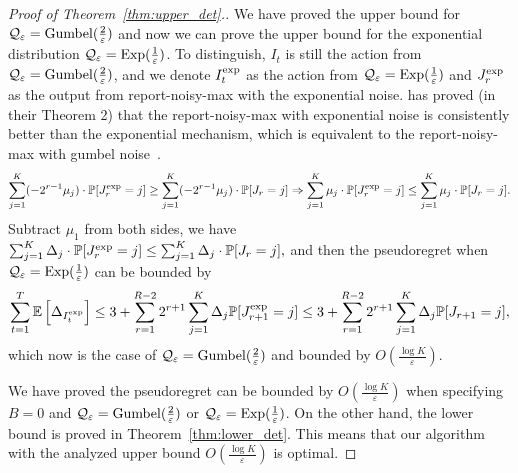 \begin{proof}[Proof of Theorem~\ref{thm:upper_det}.]
We have proved the upper bound for $\mathcal{Q}_{\varepsilon} = \mathrm{Gumbel}(\frac{2}{\varepsilon})$ and now we can prove the upper bound for the exponential distribution $\mathcal{Q}_{\varepsilon} = \mathrm{Exp}(\frac{1}{\varepsilon})$.
To distinguish, $I_t$ is still the action from $\mathcal{Q}_{\varepsilon} = \mathrm{Gumbel}(\frac{2}{\varepsilon})$, and we denote $I_t^{\rm exp}$ as the action from $\mathcal{Q}_{\varepsilon} = \mathrm{Exp}(\frac{1}{\varepsilon})$ and $J_r^{\rm exp}$ as the output from report-noisy-max with the exponential noise.
\citet{mckenna2020permute} has proved (in their Theorem 2) that the report-noisy-max with exponential noise is consistently better than the exponential mechanism, which is equivalent to the report-noisy-max with gumbel noise~\citep{gumbel1954statistical, qiao2021oneshot}.
$$
\sum_{j=1}^{K}(-2^{r-1}\mu_j)\cdot \mathbb{P}[J_{r}^{\rm exp} = j] \geq \sum_{j=1}^{K}(-2^{r-1}\mu_j)\cdot \mathbb{P}[J_{r} = j]
\Rightarrow \sum_{j=1}^{K}\mu_j\cdot \mathbb{P}[J_{r}^{\rm exp} = j] \leq \sum_{j=1}^{K}\mu_j\cdot \mathbb{P}[J_{r} = j].
$$
Subtract $\mu_1$ from both sides, we have 
$
\sum_{j=1}^{K}\Delta_j\cdot \mathbb{P}[J_{r}^{\rm exp} = j]\leq \sum_{j=1}^{K}\Delta_j\cdot \mathbb{P}[J_{r} = j],
$
and then the pseudoregret when $\mathcal{Q}_{\varepsilon} = \mathrm{Exp}(\frac{1}{\varepsilon})$ can be bounded by
\begin{align*}
\sum_{t=1}^T \mathbb{E}\left[\Delta_{I_t^{\rm exp}}\right]  \leq 3 + \sum_{r=1}^{R-2} 2^{r+1}\sum_{j=1}^{K}\Delta_{j}\mathbb{P}[J_{r+1}^{\rm exp} = j]  \leq 3 + \sum_{r=1}^{R-2} 2^{r+1}\sum_{j=1}^{K}\Delta_{j}\mathbb{P}[J_{r+1} = j],
\end{align*}
which now is the case of $\mathcal{Q}_{\varepsilon} = \mathrm{Gumbel}(\frac{2}{\varepsilon})$ and bounded by $O\left(\frac{\log K}{\varepsilon}\right)$. 

We have proved the pseudoregret can be bounded by $O\left(\frac{\log K}{\varepsilon}\right)$ when specifying $B=0$ and $\mathcal{Q}_{\varepsilon} = \mathrm{Gumbel}(\frac{2}{\varepsilon})$ or $\mathcal{Q}_{\varepsilon} = \mathrm{Exp}(\frac{1}{\varepsilon})$.
On the other hand, the lower bound is proved in Theorem~\ref{thm:lower_det}. This means that our algorithm with the analyzed upper bound $O\left(\frac{\log K}{\varepsilon}\right)$ is optimal.
\end{proof}

